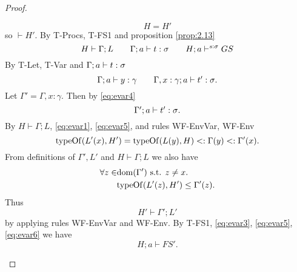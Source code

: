 \begin{proof}
\begin{description}
\begin{description}
\begin{description}
\begin{equation}
                H = H'
              \end{equation}
              so $\vdash H'$.
              By {\sc T-Procs}, {\sc T-FS1} and proposition \ref{prop:2.13}
              \begin{equation} \label{eq:evar3}
                H \vdash \Gamma; L \quad\quad \mbox{$\Gamma;a\vdash t:\sigma$}
                \quad\quad H; a \vdash^{s: \sigma} GS
              \end{equation}
              By {\sc T-Let, T-Var} and $\mbox{$\Gamma;a\vdash t:\sigma$}$
              \begin{equation} \label{eq:evar4}
                \mbox{$\Gamma;a\vdash y:\gamma$} \quad\quad \mbox{$\Gamma, x:
                \gamma;a\vdash t':\sigma$}.
              \end{equation}
              Let $\Gamma' = \Gamma, x: \gamma$.
              Then by \eqref{eq:evar4}
              \begin{equation} \label{eq:evar5}
                \mbox{$\Gamma';a\vdash t':\sigma$}.
              \end{equation}
              By $H \vdash \Gamma; L$, \eqref{eq:evar1}, \eqref{eq:evar5}, and
              rules {\sc WF-EnvVar}, {\sc WF-Env}
              \begin{equation*}
                \mbox{$\mathrm{typeOf}$}(L'(x), H') = \mbox{$\mathrm{typeOf}$}(L(y), H) <: \Gamma(y) <:
                \Gamma'(x).
              \end{equation*}
              From definitions of $\Gamma', L'$ and $H \vdash \Gamma;L$ we also have 
              \begin{equation*}
                \begin{aligned}
                  \forall z \in &\mbox{$\mathrm{dom}$}(\Gamma') \text{ s.t. } z \neq x. \\
                  & \mbox{$\mathrm{typeOf}$}(L'(z), H') \leq \Gamma'(z).
                \end{aligned}
              \end{equation*}
              Thus
              \begin{equation} \label{eq:evar6}
                H' \vdash \Gamma'; L'
              \end{equation}
              by applying rules {\sc WF-EnvVar} and {\sc WF-Env}.
              By {\sc T-FS1}, \eqref{eq:evar3}, \eqref{eq:evar5},
              \eqref{eq:evar6} we have
              \begin{equation} \label{eq:evar7}
                H; a \vdash FS'.
              \end{equation}

\end{description}
\end{description}
\end{description}
\end{proof}
